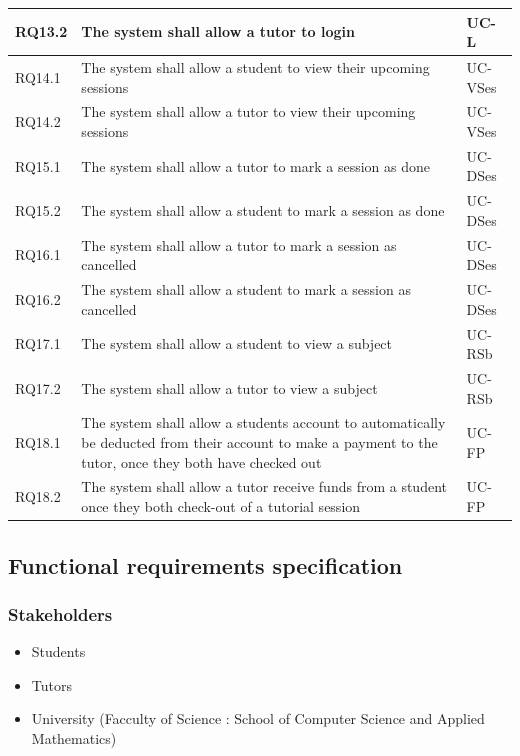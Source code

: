 \documentclass[12pt]{article}
\begin{document}
{\begin{longtable}{| l | p{10cm}| l |}
				RQ13.2 & The system shall allow a tutor to login &UC-L\\ \hline
				RQ14.1 & The system shall allow a student to view their upcoming sessions  &UC-VSes\\ \hline
				RQ14.2 & The system shall allow a tutor to view their upcoming sessions  &UC-VSes\\ \hline
				RQ15.1 & The system shall allow a tutor to mark a session as done &UC-DSes\\ \hline
				RQ15.2 & The system shall allow a student to mark a session as done &UC-DSes\\ \hline
				RQ16.1 & The system shall allow a tutor to mark a session as cancelled &UC-DSes\\ \hline
				RQ16.2 & The system shall allow a student to mark a session as cancelled &UC-DSes\\ \hline
				RQ17.1 & The system shall allow a student to view a subject &UC-RSb\\ \hline
				RQ17.2 & The system shall allow a tutor to view a subject &UC-RSb\\ \hline
				RQ18.1 & The system shall allow a students account to automatically be deducted from their account to make a payment to the tutor, once they both have checked out  &UC-FP\\ \hline
				RQ18.2 & The system shall allow a tutor receive funds from a student once they both check-out of a tutorial session &UC-FP\\ \hline
\end{longtable}
}
\subsection{Functional requirements specification}
\subsubsection{Stakeholders}
\begin{itemize}
\item Students
\item Tutors
\item University (Facculty of Science : School of Computer Science and Applied Mathematics)
\end{itemize}
\end{document}
